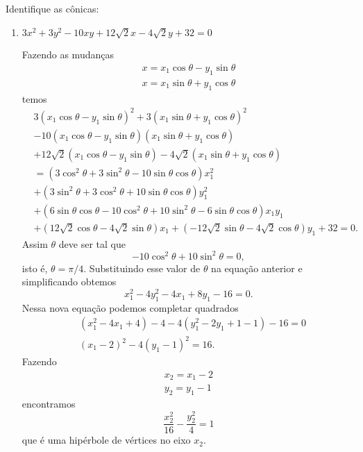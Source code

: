 \begin{exemplos}
  Identifique as c\^onicas:
  \begin{enumerate}
    \item $3x^2 + 3y^2 - 10xy + 12\sqrt{2}x - 4\sqrt{2}y + 32 = 0$
    \begin{solucao}
      Fazendo as mudan\c{c}as
      \begin{align}
        x = x_1\cos\theta - y_1\sin\theta\\
        x = x_1\sin\theta + y_1\cos\theta
      \end{align}
      temos
      \begin{align*}
        &3(x_1\cos\theta - y_1\sin\theta)^2 + 3(x_1\sin\theta + y_1\cos\theta)^2\\ &- 10(x_1\cos\theta - y_1\sin\theta)(x_1\sin\theta + y_1\cos\theta)\\ & + 12\sqrt{2}(x_1\cos\theta - y_1\sin\theta) - 4\sqrt{2}(x_1\sin\theta + y_1\cos\theta)\\ &= (3\cos^2\theta + 3\sin^2\theta - 10\sin\theta\cos\theta)x_1^2 \\ &+ (3\sin^2\theta + 3\cos^2\theta + 10\sin\theta\cos\theta)y_1^2 \\ &+ (6\sin\theta\cos\theta - 10\cos^2\theta + 10\sin^2\theta - 6\sin\theta\cos\theta)x_1y_1 \\ &+ (12\sqrt{2}\cos\theta - 4\sqrt{2}\sin\theta)x_1 + (-12\sqrt{2}\sin\theta - 4\sqrt{2}\cos\theta)y_1 + 32 = 0.
      \end{align*}
      Assim $\theta$ deve ser tal que
      \[
        -10\cos^2\theta + 10\sin^2\theta = 0,
      \]
      isto \'e, $\theta = \pi/4$. Substituindo esse valor de $\theta$ na equa\c{c}\~ao anterior e simplificando obtemos
      \[
        x_1^2 - 4y_1^2 - 4x_1 + 8y_1 - 16 = 0.
      \]
      Nessa nova equa\c{c}\~ao podemos completar quadrados
      \begin{align*}
        &(x_1^2 - 4x_1 + 4) - 4 - 4(y_1^2 - 2y_1 + 1 - 1) - 16 = 0\\
        &(x_1 - 2)^2 - 4(y_1 - 1)^2 = 16.
      \end{align*}
      Fazendo
      \begin{align*}
        x_2 = x_1 - 2\\
        y_2 = y_1 - 1
      \end{align*}
      encontramos
      \[
        \dfrac{x_2^2}{16} - \dfrac{y_2^2}{4} = 1
      \]
      que \'e uma hip\'erbole de v\'ertices no eixo $x_2$.
      \begin{figure}[!h]
        \centering

\end{figure}
\end{solucao}
\end{enumerate}
\end{exemplos}
